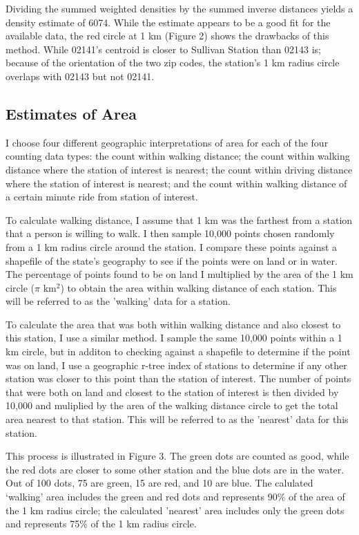 \documentclass{article}
\begin{document}
Dividing the summed weighted densities by the summed inverse distances yields a density estimate of 6074. While the estimate appears to be a good fit for the available data, the red circle at 1 km (Figure 2) shows the drawbacks of this method. While 02141's centroid is closer to Sullivan Station than 02143 is; because of the orientation of the two zip codes, the station's 1 km radius circle overlaps with 02143 but not 02141. 

\subsection{Estimates of Area}

I choose four different geographic interpretations of area for each of the four counting data types: the count within walking distance; the count within walking distance where the station of interest is nearest; the count within driving distance where the station of interest is nearest; and the count within walking distance of a certain minute ride from station of interest. 

To calculate walking distance, I assume that 1 km was the farthest from a station that a person is willing to walk. I then sample 10,000 points chosen randomly from a 1 km radius circle around the station. I compare these points against a shapefile of the state's geography to see if the points were on land or in water. The percentage of points found to be on land I multiplied by the area of the 1 km circle ($\pi$ km$^2$) to obtain the area within walking distance of each station. This will be referred to as the 'walking' data for a station.

To calculate the area that was both within walking distance and also closest to this station, I use a similar method. I sample the same 10,000 points within a 1 km circle, but in additon to checking against a shapefile to determine if the point was on land, I use a geographic r-tree index of stations to determine if any other station was closer to this point than the station of interest. The number of points that were both on land and closest to the station of interest is then divided by 10,000 and muliplied by the area of the walking distance circle to get the total area nearest to that station. This will be referred to as the 'nearest' data for this station.

This process is illustrated in Figure 3. The green dots are counted as good, while the red dots are closer to some other station and the blue dots are in the water. Out of 100 dots, 75 are green, 15 are red, and 10 are blue. The calulated `walking' area includes the green and red dots and represents 90\% of the area of the 1 km radius circle; the calculated 'nearest' area includes only the green dots and represents 75\% of the 1 km radius circle. 
\end{document}

